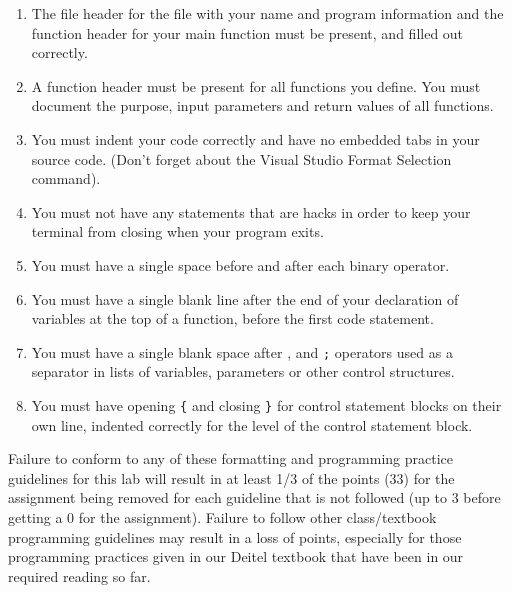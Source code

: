\documentclass[11pt]{article}
\begin{document}
\begin{enumerate}
\item The file header for the file with your name and program information
  and the function header for your main function must be present, and
  filled out correctly.
\item A function header must be present for all functions you define.
  You must document the purpose, input parameters and return values
  of all functions.
\item You must indent your code correctly and have no embedded tabs in
  your source code. (Don't forget about the Visual Studio Format
  Selection command).
\item You must not have any statements that are hacks in order to keep
  your terminal from closing when your program exits.
\item You must have a single space before and after each binary operator.
\item You must have a single blank line after the end of your declaration
  of variables at the top of a function, before the first code
  statement.
\item You must have a single blank space after , and \verb~;~ operators used as a
  separator in lists of variables, parameters or other control
  structures.
\item You must have opening \verb~{~ and closing \verb~}~ for control statement blocks
  on their own line, indented correctly for the level of the control
  statement block.
\end{enumerate}

Failure to conform to any of these formatting and programming practice
guidelines for this lab will result in at least 1/3 of the points (33)
for the assignment being removed for each guideline that is not
followed (up to 3 before getting a 0 for the assignment). Failure to
follow other class/textbook programming guidelines may result in a
loss of points, especially for those programming practices given in
our Deitel textbook that have been in our required reading so far.
\end{document}
